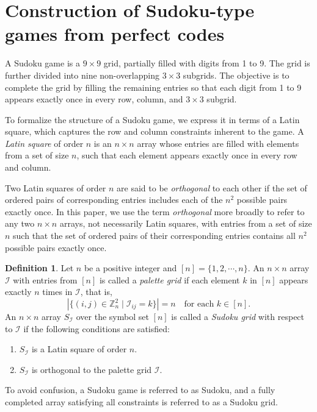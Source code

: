 \documentclass{article}
\theoremstyle{definition}
\newtheorem{definition}{Definition}[section]
\begin{document}
\section{Construction of Sudoku-type games from perfect codes}
A Sudoku game is a $9 \times 9$ grid, partially filled with digits from 1 to 9. The grid is further divided into nine non-overlapping $3 \times 3$ subgrids. The objective is to complete the grid by filling the remaining entries so that each digit from 1 to 9 appears exactly once in every row, column, and $3\times 3$ subgrid.


To formalize the structure of a Sudoku game, we express it in terms of a Latin square, which captures the row and column constraints inherent to the game. A \textit{Latin square} of order $n$ is an $n \times n$ array whose entries are filled with elements from a set of size $n$, such that each element appears exactly once in every row and column.

Two Latin squares of order $n$ are said to be \textit{orthogonal} to each other if the set of ordered pairs of corresponding entries includes each of the $n^2$ possible pairs exactly once. In this paper, we use the term \textit{orthogonal} more broadly to refer to any two $n \times n$ arrays, not necessarily Latin squares, with entries from a set of size $n$ such that the set of ordered pairs of their corresponding entries contains all $n^2$ possible pairs exactly once.

\begin{definition}
Let $n$ be a positive integer and $[n]=\{1, 2, \cdots, n\}$. An $n\times n$ array $\mathcal{I}$ with entries from $[n]$ is called a \textit{palette grid} if each element $k$ in $[n]$ appears exactly $n$ times in $\mathcal{I}$, that is,
\[
|\{(i, j) \in \mathbb{Z}_n^2 \mid \mathcal{I}_{ij} = k\}| = n\quad\mbox{for each }k\in[n].
\]
An $n \times n$ array $S_\mathcal{I}$ over the symbol set $[n]$ is called a \textit{Sudoku grid} with respect to $\mathcal{I}$ if the following conditions are satisfied:
\begin{enumerate}
\item[(i)] $S_\mathcal{I}$ is a Latin square of order $n$.
\item[(ii)] $S_\mathcal{I}$ is orthogonal to the palette grid $\mathcal{I}$.
\end{enumerate}
\end{definition}

To avoid confusion, a Sudoku game is referred to as Sudoku, and a fully completed array satisfying all constraints is referred to as a Sudoku grid.
\end{document}

